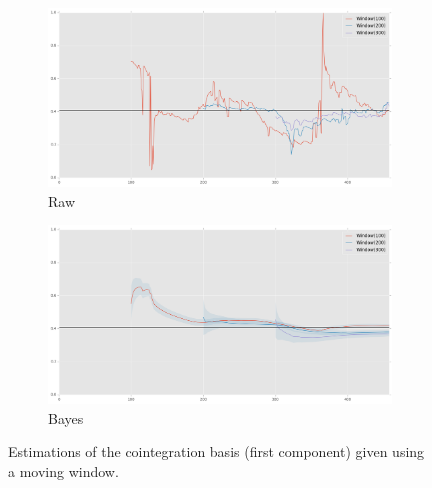 \begin{figure}[H]
    \begin{subfigure}[b]{0.49\textwidth}
        \centering
        \includegraphics[width=\figwidth]{img/estimation/windowed_raw.png}

        \caption{Raw}
    \end{subfigure}
    \hfill
    \begin{subfigure}[b]{0.49\textwidth}
        \centering
        \includegraphics[width=\figwidth]{img/estimation/windowed_bayes.png}

        \caption{Bayes}
    \end{subfigure}

    \caption{Estimations of the cointegration basis (first component) given
    using a moving window.}\label{fig:estimation:windowed}
\end{figure}

